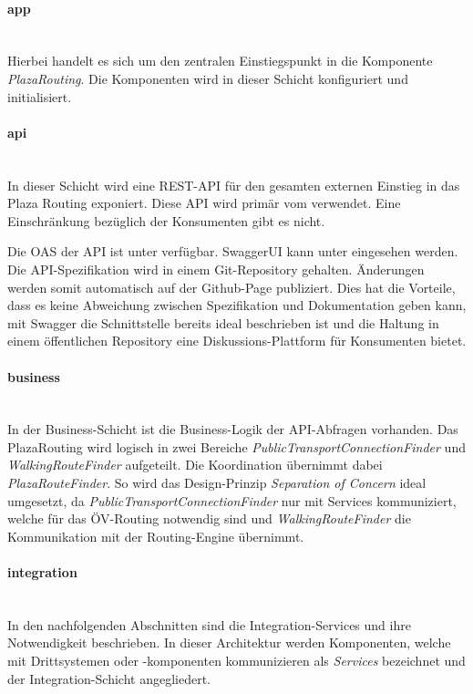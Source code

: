 \paragraph{app}\label{architektur:app-layer}~\\
Hierbei handelt es sich um den zentralen Einstiegspunkt in die Komponente \emph{PlazaRouting}. Die Komponenten wird in dieser Schicht konfiguriert und initialisiert.

\paragraph{api}\label{architektur:api-layer}~\\
In dieser Schicht wird eine \ac{REST}-\ac{API} für den gesamten externen Einstieg in das Plaza Routing exponiert. Diese \ac{API} wird primär vom  verwendet. Eine Einschränkung bezüglich der Konsumenten gibt es nicht.

Die \ac{OAS} \cite{open-api-specificaiton} der \ac{API} ist unter \cite{plaza-routing-api-spez} verfügbar. SwaggerUI kann unter \cite{plaza-routing-api-swaggerui} eingesehen werden. Die {API}-Spezifikation wird in einem Git-Repository gehalten. Änderungen werden somit automatisch auf der Github-Page \cite{plaza-routing-api-spez} publiziert. Dies hat die Vorteile, dass es keine Abweichung zwischen Spezifikation und Dokumentation geben kann, mit Swagger \cite{swagger} die Schnittstelle bereits ideal beschrieben ist und die Haltung in einem öffentlichen Repository eine Diskussions-Plattform für Konsumenten bietet.

\paragraph{business}\label{architektur:business-layer}~\\
In der Business-Schicht ist die Business-Logik der \ac{API}-Abfragen vorhanden. Das PlazaRouting wird logisch in zwei Bereiche \emph{PublicTransportConnectionFinder} und \emph{WalkingRouteFinder} aufgeteilt. Die Koordination übernimmt dabei \emph{PlazaRouteFinder}. So wird das Design-Prinzip \emph{Separation of Concern} ideal umgesetzt, da \emph{PublicTransportConnectionFinder} nur mit Services kommuniziert, welche für das ÖV-Routing notwendig sind und \emph{WalkingRouteFinder} die Kommunikation mit der Routing-Engine übernimmt.

\paragraph{integration}\label{architektur:integration-layer}~\\
In den nachfolgenden Abschnitten sind die Integration-Services und ihre Notwendigkeit beschrieben. In dieser Architektur werden Komponenten, welche mit Drittsystemen oder -komponenten kommunizieren als \emph{Services} bezeichnet und der Integration-Schicht angegliedert.

